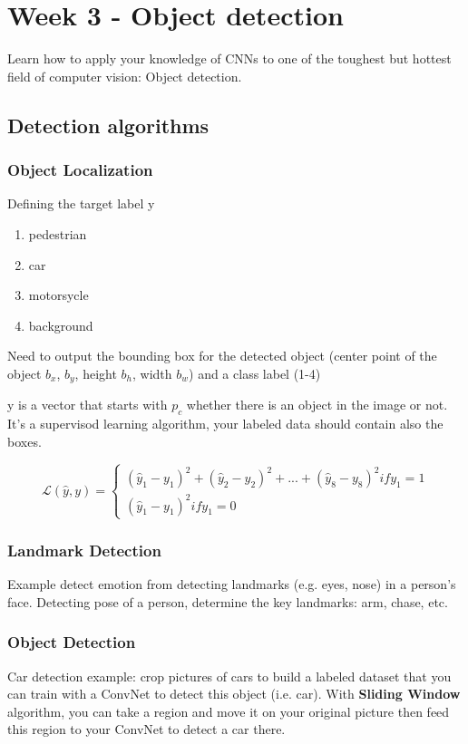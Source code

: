 \section{Week 3 - Object detection}
Learn how to apply your knowledge of CNNs to one of the toughest but hottest field of computer vision: Object detection.
\subsection{Detection algorithms}
\subsubsection{Object Localization}
Defining the target label y

\begin{enumerate}
    \item pedestrian
    \item car
    \item motorsycle
    \item background
\end{enumerate}
Need to output the bounding box for the detected object (center point of the object $b_x$, $b_y$, height $b_h$, width $b_w$) and a class label (1-4)

y is a vector that starts with $p_c$ whether there is an object in the image or not. It's a supervisod learning algorithm, your labeled data should contain also the boxes.

\begin{equation*}
    \mathcal{L}(\hat{y}, y) = \left\{
                \begin{array}{ll}
                  (\hat{y}_1-y_1)^2 + (\hat{y}_2-y_2)^2 + . . . + (\hat{y}_8-y_8)^2 if y_1= 1\\
                  (\hat{y}_1-y_1)^2 if y_1= 0
                \end{array}
              \right.
\end{equation*}

\subsubsection{Landmark Detection}
Example detect emotion from detecting landmarks (e.g. eyes, nose) in a person's face. Detecting pose of a person, determine the key landmarks: arm, chase, etc.

\subsubsection{Object Detection}
Car detection example: crop pictures of cars to build a labeled dataset that you can train with a ConvNet to detect this object (i.e. car).
With \textbf{Sliding Window} algorithm, you can take a region and move it on your original picture then feed this region to your ConvNet to detect a car there.

